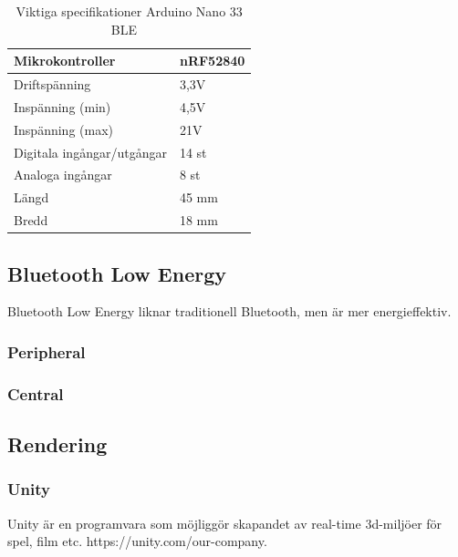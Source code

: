 \documentclass[a4paper]{article}
\begin{document}
\begin{sloppypar}
    \begin{table}[h]
        \begin{center}
            \caption{Viktiga specifikationer Arduino Nano 33 BLE ~\cite{Arduino:ABX00030}}
            \label{table:ArduinoNano}
            \begin{tabular}{ | l | l | }
                \hline
                Mikrokontroller            & nRF52840 \\
                \hline
                Driftspänning              & 3,3V     \\
                \hline
                Inspänning (min)           & 4,5V     \\
                \hline
                Inspänning (max)           & 21V      \\
                \hline
                Digitala ingångar/utgångar & 14 st    \\
                \hline
                Analoga ingångar           & 8 st     \\
                \hline
                Längd                      & 45 mm    \\
                \hline
                Bredd                      & 18 mm    \\
                \hline
            \end{tabular}
        \end{center}
    \end{table}
    \subsection{Bluetooth Low Energy}
    Bluetooth Low Energy liknar traditionell Bluetooth, men är mer energieffektiv.
    \subsubsection{Peripheral}
    \subsubsection{Central}

    \subsection{Rendering}
    \subsubsection{Unity}
    Unity är en programvara som möjliggör skapandet av real-time 3d-miljöer för spel, film etc. https://unity.com/our-company.


\end{sloppypar}
\end{document}
